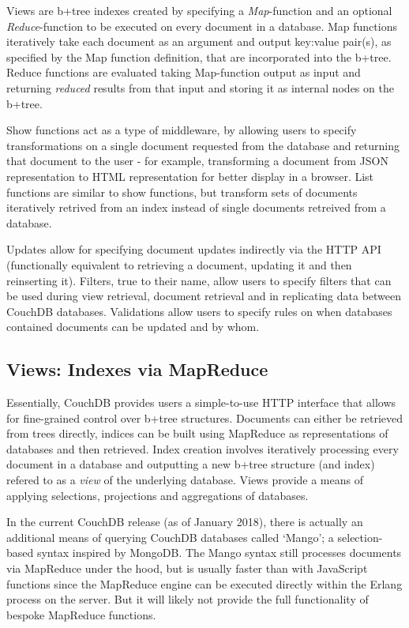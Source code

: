 Views are b+tree indexes created by specifying a \textit{Map}-function and an optional \textit{Reduce}-function to be executed on every document in a database. Map functions iteratively take each document as an argument and output key:value pair(s), as specified by the Map function definition, that are incorporated into the b+tree. Reduce functions are evaluated taking Map-function output as input and returning \textit{reduced} results from that input and storing it as internal nodes on the b+tree.

Show functions act as a type of middleware, by allowing users to specify transformations on a single document requested from the database and returning that document to the user - for example, transforming a document from JSON representation to HTML representation for better display in a browser. List functions are similar to show functions, but transform sets of documents iteratively retrived from an index instead of single documents retreived from a database.

Updates allow for specifying document updates indirectly via the HTTP API (functionally equivalent to retrieving a document, updating it and then reinserting it). Filters, true to their name, allow users to specify filters that can be used during view retrieval, document retrieval and in replicating data between CouchDB databases. Validations allow users to specify rules on when databases contained documents can be updated and by whom.

\subsection{Views: Indexes via MapReduce}
Essentially, CouchDB provides users a simple-to-use HTTP interface that allows for fine-grained control over b+tree structures. Documents can either be retrieved from trees directly, indices can be built using MapReduce as representations of databases and then retrieved. Index creation involves iteratively processing every document in a database and outputting a new b+tree structure (and index) refered to as a \textit{view} of the underlying database. Views provide a means of applying selections, projections and aggregations of databases.

In the current CouchDB release (as of January 2018), there is actually an additional means of querying CouchDB databases called `Mango'; a selection-based syntax inspired by MongoDB. The Mango syntax still processes documents via MapReduce under the hood, but is usually faster than with JavaScript functions since the MapReduce engine can be executed directly within the Erlang process on the server. But it will likely not provide the full functionality of bespoke MapReduce functions.

